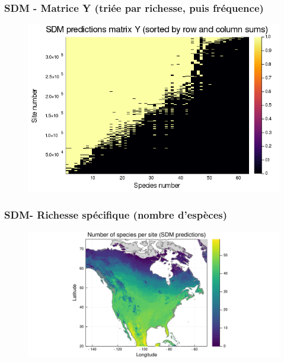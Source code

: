 \documentclass[10pt]{beamer}
\begin{document}
\begin{frame}
  \frametitle{SDM - Matrice Y (triée par richesse, puis fréquence)}
  \begin{figure}
    \centering
    \includegraphics[scale=0.4]{../fig/sdm/sdm-Y-rowcolsorted.png}
  \end{figure}
\end{frame}

\begin{frame}
  \frametitle{SDM- Richesse spécifique (nombre d'espèces)}
  \begin{figure}
    \centering
    \hspace*{-2cm}\includegraphics[scale=0.5]{../fig/sdm/sdm-richness.pdf}
  \end{figure}
\end{frame}
\end{document}
